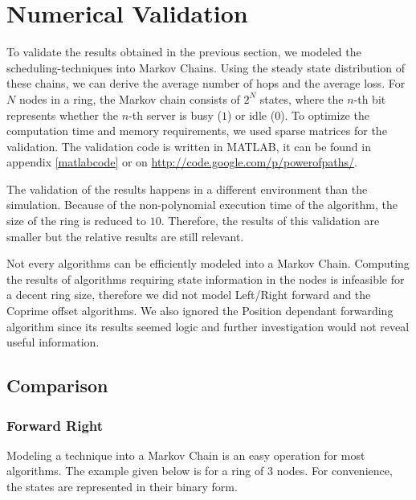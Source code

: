\documentclass[10pt,a4paper]{article}
\begin{document}
\section{Numerical Validation}
\label{secvalidation}

To validate the results obtained in the previous section, we modeled the scheduling-techniques into Markov Chains. Using the steady state distribution of these chains, we can derive the average number of hops and the average loss.
For $N$ nodes in a ring, the Markov chain consists of $2^N$ states, where the $n$-th bit represents whether the $n$-th server is busy ($1$) or idle ($0$). To optimize the computation time and memory requirements, we used sparse matrices for the validation. The validation code is written in MATLAB, it can be found in appendix \ref{matlabcode} or on \url{http://code.google.com/p/powerofpaths/}.

The validation of the results happens in a different environment than the simulation. Because of the non-polynomial execution time of the algorithm, the size of the ring is reduced to $10$. Therefore, the results of this validation are smaller but the relative results are still relevant.

Not every algorithms can be efficiently modeled into a Markov Chain. Computing the results of algorithms requiring state information in the nodes is infeasible for a decent ring size, therefore we did not model Left/Right forward and the Coprime offset algorithms. We also ignored the Position dependant forwarding algorithm since its results seemed logic and further investigation would not reveal useful information.

\subsection{Comparison}
\subsubsection*{Forward Right}
Modeling a technique into a Markov Chain is an easy operation for most algorithms. The example given below is for a ring of 3 nodes. For convenience, the states are represented in their binary form.
\end{document}
